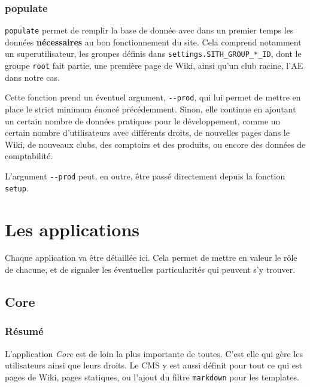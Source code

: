 \documentclass[a4paper]{report}
\begin{document}
\subsection{populate}
\label{sub:populate}
\par \verb#populate# permet de remplir la base de donnée avec dans un premier temps les données \textbf{nécessaires} au
bon fonctionnement du site. Cela comprend notamment un superutilisateur, les groupes définis dans
\verb#settings.SITH_GROUP_*_ID#, dont le groupe \verb#root# fait partie, une première page de Wiki, ainsi qu'un club
racine, l'AE dans notre cas.
\par Cette fonction prend un éventuel argument, \verb#--prod#, qui lui permet de mettre en place le strict minimum
énoncé précédemment. Sinon, elle continue en ajoutant un certain nombre de données pratiques pour le développement,
comme un certain nombre d'utilisateurs avec différents droits, de nouvelles pages dans le Wiki, de nouveaux clubs, des
comptoirs et des produits, ou encore des données de comptabilité.
\par L'argument \verb#--prod# peut, en outre, être passé directement depuis la fonction \verb#setup#.

\chapter{Les applications}
\label{cha:les_applications}
\par Chaque application va être détaillée ici. Cela permet de mettre en valeur le rôle de chacune, et de signaler les
éventuelles particularités qui peuvent s'y trouver.

\section{Core}
\label{sec:core}
\subsection{Résumé}
\label{sub:resume}
\par L'application \emph{Core} est de loin la plus importante de toutes. C'est elle qui gère les utilisateurs ainsi que
leurs droits. Le CMS y est aussi définit pour tout ce qui est pages de Wiki, pages statiques, ou l'ajout du filtre
\verb#markdown# pour les templates.
\end{document}
